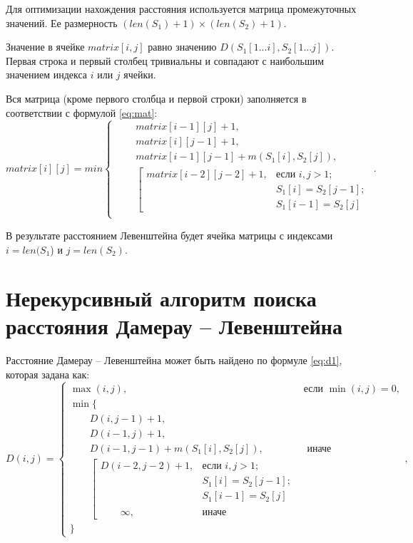 Для оптимизации нахождения расстояния используется матрица промежуточных значений. Ее размерность $(len(S_{1})+ 1) \times (len(S_{2}) + 1)$.

Значение в ячейке $matrix[i, j]$ равно значению $D(S_{1}[1...i], S_{2}[1...j])$. Первая строка и первый столбец тривиальны и совпадают с наибольшим значением индекса $i$ или $j$ ячейки. 

Вся матрица (кроме первого столбца и первой строки) заполняется в соответствии с формулой \ref{eq:mat}:
\begin{equation}
	\label{eq:mat}
	matrix[i][j] = min \begin{cases}
		\qquad matrix[i-1][j] + 1,\\
		\qquad matrix[i][j-1] + 1,\\
		\qquad matrix[i-1][j-1] + m(S_{1}[i], S_{2}[j]),\\
		\qquad \left[ \begin{array}{cc}matrix[i-2][j-2] + 1, &\text{если }i,j > 1;\\
			\qquad &\text{}S_{1}[i] = S_{2}[j-1];\\
			\qquad &\text{}S_{1}[i-1] = S_{2}[j]\end{array}\right.\\	
	\end{cases}.
\end{equation}

В результате расстоянием Левенштейна будет ячейка матрицы с индексами $i = len(S_{1}$) и $j = len(S_{2})$.

\section{Нерекурсивный алгоритм поиска расстояния Дамерау -- Левенштейна}

Расстояние Дамерау -- Левенштейна может быть найдено по формуле \ref{eq:d1}, которая задана как:
\begin{equation}
	\label{eq:d1}
	D(i, j) = \begin{cases}
		\max(i, j), &\text{если }\min(i, j) = 0,\\
		\min \lbrace \\
		\qquad D(i, j-1) + 1,\\
		\qquad D(i-1, j) + 1,\\
		\qquad D(i-1, j-1) + m(S_{1}[i], S_{2}[j]), &\text{ иначе}\\
		\qquad \left[ \begin{array}{cc}D(i-2, j-2) + 1, &\text{если }i,j > 1;\\
			\qquad &\text{}S_{1}[i] = S_{2}[j-1];\\
			\qquad &\text{}S_{1}	[i-1] = S_{2}[j]  \\
			\qquad \\
			\qquad \infty, & \text{иначе}\end{array}\right.\\
		\rbrace
	\end{cases},
\end{equation}


